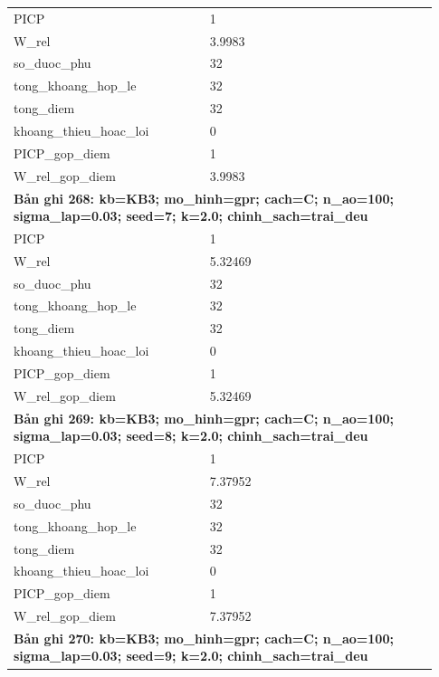 \begin{longtable}{p{0.43\linewidth}p{0.50\linewidth}}
PICP & 1 \\
W\_\allowbreak rel & 3.9983 \\
so\_\allowbreak duoc\_\allowbreak phu & 32 \\
tong\_\allowbreak khoang\_\allowbreak hop\_\allowbreak le & 32 \\
tong\_\allowbreak diem & 32 \\
khoang\_\allowbreak thieu\_\allowbreak hoac\_\allowbreak loi & 0 \\
PICP\_\allowbreak gop\_\allowbreak diem & 1 \\
W\_\allowbreak rel\_\allowbreak gop\_\allowbreak diem & 3.9983 \\
\midrule
\multicolumn{2}{p{0.95\linewidth}}{\textbf{Bản ghi 268: kb=KB3; mo\_hinh=gpr; cach=C; n\_ao=100; sigma\_lap=0.03; seed=7; k=2.0; chinh\_sach=trai\_deu}} \\
PICP & 1 \\
W\_\allowbreak rel & 5.32469 \\
so\_\allowbreak duoc\_\allowbreak phu & 32 \\
tong\_\allowbreak khoang\_\allowbreak hop\_\allowbreak le & 32 \\
tong\_\allowbreak diem & 32 \\
khoang\_\allowbreak thieu\_\allowbreak hoac\_\allowbreak loi & 0 \\
PICP\_\allowbreak gop\_\allowbreak diem & 1 \\
W\_\allowbreak rel\_\allowbreak gop\_\allowbreak diem & 5.32469 \\
\midrule
\multicolumn{2}{p{0.95\linewidth}}{\textbf{Bản ghi 269: kb=KB3; mo\_hinh=gpr; cach=C; n\_ao=100; sigma\_lap=0.03; seed=8; k=2.0; chinh\_sach=trai\_deu}} \\
PICP & 1 \\
W\_\allowbreak rel & 7.37952 \\
so\_\allowbreak duoc\_\allowbreak phu & 32 \\
tong\_\allowbreak khoang\_\allowbreak hop\_\allowbreak le & 32 \\
tong\_\allowbreak diem & 32 \\
khoang\_\allowbreak thieu\_\allowbreak hoac\_\allowbreak loi & 0 \\
PICP\_\allowbreak gop\_\allowbreak diem & 1 \\
W\_\allowbreak rel\_\allowbreak gop\_\allowbreak diem & 7.37952 \\
\midrule
\multicolumn{2}{p{0.95\linewidth}}{\textbf{Bản ghi 270: kb=KB3; mo\_hinh=gpr; cach=C; n\_ao=100; sigma\_lap=0.03; seed=9; k=2.0; chinh\_sach=trai\_deu}} \\

\end{longtable}
